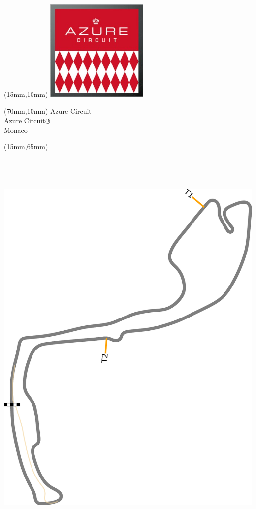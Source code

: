 \null\newpage
\begin{textblock*}{50mm}(15mm,10mm)%
\includegraphics[width=50mm]{LG/2015-05-20_00072.png}
\end{textblock*}
\begin{textblock*}{130mm}(70mm,10mm)%
{\fontsize{20}{20}\selectfont Azure Circuit\\}
{\fontsize{16}{16}\selectfont Azure Circuit\hfill \huge$\circlearrowleft$\\}
{\fontsize{12}{12}\selectfont Monaco\\}
\end{textblock*}
\begin{textblock*}{185mm}(15mm,65mm)%
\centering
\mbox{\includegraphics[width=185mm,height=210mm,keepaspectratio]{PT/AZCI.pdf}}
\end{textblock*}
